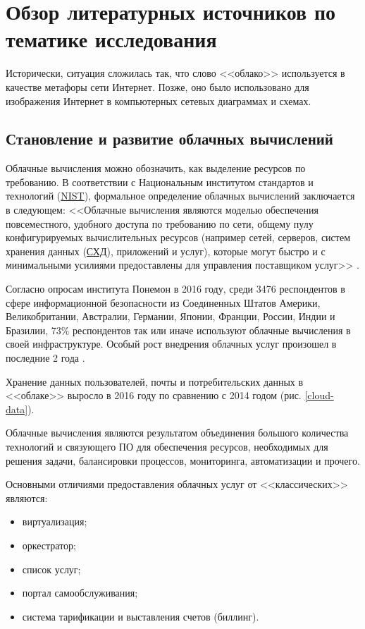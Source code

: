 \section{Обзор литературных источников по тематике исследования}

Исторически, ситуация сложилась так, что слово <<облако>> используется в качестве метафоры сети Интернет.
Позже, оно было использовано для изображения Интернет в компьютерных сетевых диаграммах и схемах.

\subsection{Становление и развитие облачных вычислений}

Облачные вычисления можно обозначить, как выделение ресурсов по требованию.
В соответствии с Национальным институтом стандартов и технологий (\hyperlink{nist}{NIST}), формальное определение облачных вычислений заключается в следующем:
<<Облачные вычисления являются моделью обеспечения повсеместного, удобного доступа по требованию по сети, общему пулу конфигурируемых вычислительных ресурсов (например сетей, серверов, систем хранения данных (\hyperlink{storage}{СХД}), приложений и услуг), которые могут быстро и с минимальными усилиями предоставлены для управления поставщиком услуг>> \cite{nist}.

Согласно опросам института Понемон в 2016 году, среди 3476 респондентов в сфере информационной безопасности из Соединенных Штатов Америки, Великобритании, Австралии, Германии, Японии, Франции, России, Индии и Бразилии, 73\% респондентов так или иначе используют облачные вычисления в своей инфраструктуре.
Особый рост внедрения облачных услуг произошел в последние 2 года \cite{gemalto}.

Хранение данных пользователей, почты и потребительских данных в <<облаке>> выросло в 2016 году по сравнению с 2014 годом (рис. \ref{cloud-data}).


Облачные вычисления являются результатом объединения большого количества технологий и связующего ПО для обеспечения ресурсов, необходимых для решения задачи, балансировки процессов, мониторинга, автоматизации и прочего.

Основными отличиями предоставления облачных услуг от <<классических>> являются:
\begin{itemize}
  \item виртуализация;
  \item оркестратор;
  \item список услуг;
  \item портал самообслуживания;
  \item система тарификации и выставления счетов (биллинг).
\end{itemize}

